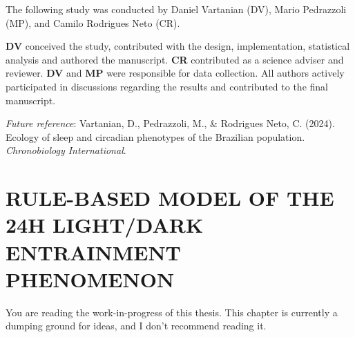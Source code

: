 \documentclass[
  12pt,
  a4paper,
  oneside]{tesesusp}
\begin{document}
\begin{tcolorbox}[enhanced jigsaw, rightrule=.15mm, colback=white, colbacktitle=quarto-callout-note-color!10!white, toptitle=1mm, bottomtitle=1mm, toprule=.15mm, bottomrule=.15mm, colframe=quarto-callout-note-color-frame, opacitybacktitle=0.6, opacityback=0, coltitle=black, left=2mm, breakable, titlerule=0mm, title=\textcolor{quarto-callout-note-color}{\faInfo}\hspace{0.5em}{Note}, arc=.35mm, leftrule=.75mm]

The following study was conducted by Daniel Vartanian (DV), Mario
Pedrazzoli (MP), and Camilo Rodrigues Neto (CR).

\vspace{5pt}

\textbf{DV} conceived the study, contributed with the design,
implementation, statistical analysis and authored the manuscript.
\textbf{CR} contributed as a science adviser and reviewer. \textbf{DV}
and \textbf{MP} were responsible for data collection. All authors
actively participated in discussions regarding the results and
contributed to the final manuscript.

\vspace{5pt}

\emph{Future reference}: Vartanian, D., Pedrazzoli, M., \& Rodrigues
Neto, C. (2024). Ecology of sleep and circadian phenotypes of the
Brazilian population. \emph{Chronobiology International}.

\end{tcolorbox}


\hypertarget{rule-based-model-of-the-24h-lightdark-entrainment-phenomenon}{%
\chapter{RULE-BASED MODEL OF THE 24H LIGHT/DARK ENTRAINMENT
PHENOMENON}\label{rule-based-model-of-the-24h-lightdark-entrainment-phenomenon}}

\begin{tcolorbox}[enhanced jigsaw, rightrule=.15mm, colback=white, colbacktitle=quarto-callout-important-color!10!white, toptitle=1mm, bottomtitle=1mm, toprule=.15mm, bottomrule=.15mm, colframe=quarto-callout-important-color-frame, opacitybacktitle=0.6, opacityback=0, coltitle=black, left=2mm, breakable, titlerule=0mm, title=\textcolor{quarto-callout-important-color}{\faExclamation}\hspace{0.5em}{Important}, arc=.35mm, leftrule=.75mm]

You are reading the work-in-progress of this thesis. This chapter is
currently a dumping ground for ideas, and I don't recommend reading it.

\end{tcolorbox}
\end{document}
